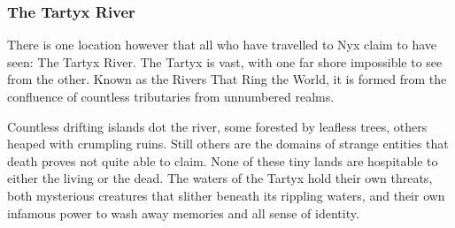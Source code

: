 \subsubsection{The Tartyx River}
There is one location however that all who have travelled to Nyx claim to have seen: The Tartyx River.
The Tartyx is vast, with one far shore impossible to see from the other.
Known as the Rivers That Ring the World, it is formed from the confluence of countless tributaries from unnumbered realms.

Countless drifting islands dot the river, some forested by leafless trees, others heaped with crumpling ruins.
Still others are the domains of strange entities that death proves not quite able to claim.
None of these tiny lands are hospitable to either the living or the dead.
The waters of the Tartyx hold their own threats, both mysterious creatures that slither beneath its rippling waters, and their own infamous power to wash away memories and all sense of identity.
